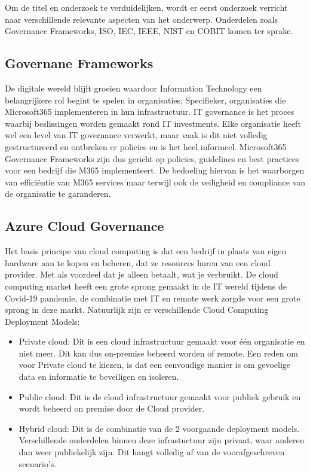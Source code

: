 Om de titel en onderzoek te verduidelijken, wordt er eerst onderzoek verricht naar verschillende relevante aspecten van het onderwerp. Onderdelen zoals Governance Frameworks, ISO, IEC, IEEE, NIST en COBIT komen ter sprake.



\subsection{Governane Frameworks}

De digitale wereld blijft groeien waardoor Information Technology een belangrijkere rol begint te spelen in organisaties; Specifieker, organisaties die Microsoft365 implementeren in hun infrastructuur.
IT governance is het proces waarbij beslissingen worden gemaakt rond IT investments. Elke organisatie heeft wel een level van IT governance verwerkt, maar vaak is dit niet volledig gestructureerd en ontbreken er policies en is het heel informeel. \autocite{Symons2005}
Microsoft365 Governance Frameworks zijn dus gericht op policies, guidelines en best practices voor een bedrijf die M365 implementeert. De bedoeling hiervan is het waarborgen van efficiëntie van M365 services maar terwijl ook de veiligheid en compliance van de organisatie te garanderen.


\subsection{Azure Cloud Governance}

Het basis principe van cloud computing is dat een bedrijf in plaats van eigen hardware aan te kopen en beheren, dat ze resources huren van een cloud provider. Met als voordeel dat je alleen betaalt, wat je verbruikt. \autocite{Mikkola2021}
De cloud computing market heeft een grote sprong gemaakt in de IT wereld tijdens de Covid-19 pandemie, de combinatie met IT en remote werk zorgde voor een grote sprong in deze markt.
Natuurlijk zijn er verschillende Cloud Computing Deployment Models:

\begin{itemize}
    \item Private cloud:
    Dit is een cloud infrastructuur gemaakt voor één organisatie en niet meer. Dit kan dus on-premise beheerd worden of remote.
    Een reden om voor Private cloud te kiezen, is dat een eenvoudige manier is om gevoelige data en informatie te beveiligen en isoleren. \autocite{Mikkola2021}
    \item Public cloud:
    Dit is de cloud infrastructuur gemaakt voor publiek gebruik en wordt beheerd on premise door de Cloud provider.
    \item Hybrid cloud:
    Dit is de combinatie van de 2 voorgaande deployment models. Verschillende onderdelen binnen deze infrastuctuur zijn privaat, waar anderen dan weer publiekelijk zijn. Dit hangt volledig af van de voorafgeschreven scenario's.
\end{itemize}

